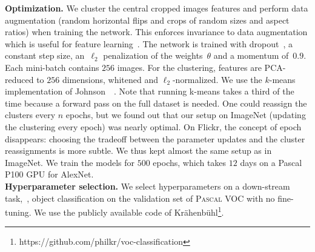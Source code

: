 \noindent\textbf{Optimization.}
We cluster the central cropped images features and perform data augmentation (random horizontal flips and crops of random sizes and aspect ratios) when training the network. 
This enforces invariance to data augmentation which is useful for feature learning~\cite{dosovitskiy2014discriminative}.
The network is trained with dropout~\cite{srivastava2014dropout}, a constant step size, an~$\ell_2$
penalization of the weights~$\theta$ and a momentum of~$0.9$.
Each mini-batch contains $256$ images.
For the clustering, features are PCA-reduced to $256$ dimensions, whitened and $\ell_2$-normalized.
We use the $k$-means implementation of Johnson~\etal~\cite{johnson2017billion}.
Note that running k-means takes a third of the time because a forward pass on the full dataset is needed.
One could reassign the clusters every $n$ epochs, but we found out that our setup on ImageNet (updating the clustering every epoch) was nearly optimal.
On Flickr, the concept of epoch disappears: choosing the tradeoff between the parameter updates and the cluster reassignments is more subtle.
We thus kept almost the same setup as in ImageNet.
We train the models for $500$ epochs, which takes $12$ days on a Pascal P100 GPU for AlexNet.
\\

\noindent\textbf{Hyperparameter selection.}
We select hyperparameters on a down-stream task,~\ie, object classification on
the validation set of \textsc{Pascal} VOC with no fine-tuning.
We use the publicly available code of Kr\"ahenb\"uhl\footnote{https://github.com/philkr/voc-classification}.

